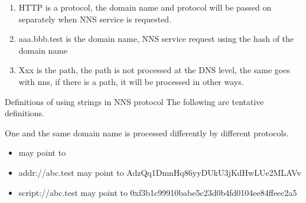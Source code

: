 \documentclass[letterpaper,10pt,english]{sphinxmanual}
\begin{document}
%
\begin{sphinxVerbatim}[commandchars=\\\{\}]
\end{sphinxVerbatim}
\begin{enumerate}
\item {} 
HTTP is a protocol, the domain name and protocol will be passed on separately when NNS service is requested.

\item {} 
aaa.bbb.test is the domain name, NNS service request using the hash of the domain name

\item {} 
Xxx is the path, the path is not processed at the DNS level, the same goes with nns, if there is a path, it will be processed in other ways.

\end{enumerate}

Definitions of using strings in NNS protocol
The following are tentative definitions.

\begin{quote}

\end{quote}

\begin{quote}

\end{quote}

\begin{quote}

\end{quote}

One and the same domain name is processed differently by different protocols.
\begin{itemize}
\item {} 
  may point to 

\item {} 
addr://abc.test  may point to AdzQq1DmnHq86yyDUkU3jKdHwLUe2MLAVv

\item {} 
script://abc.test  may point to 0xf3b1c99910babe5c23d0b4fd0104ee84ffeec2a5

\end{itemize}
\end{document}
